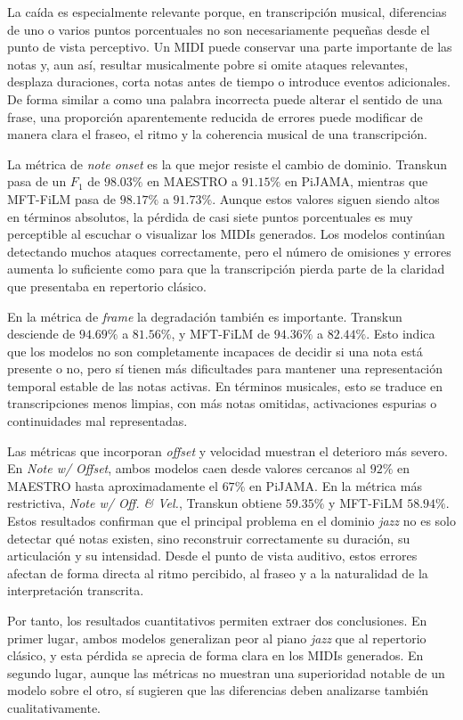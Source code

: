 \documentclass[11pt,spanish,listoffigures,listoftables]{tfgetsinf}
\begin{document}
La caída es especialmente relevante porque, en transcripción musical, diferencias de
uno o varios puntos porcentuales no son necesariamente pequeñas desde el punto de
vista perceptivo. Un MIDI puede conservar una parte importante de las notas y, aun así,
resultar musicalmente pobre si omite ataques relevantes, desplaza duraciones, corta
notas antes de tiempo o introduce eventos adicionales. De forma similar a como una
palabra incorrecta puede alterar el sentido de una frase, una proporción aparentemente
reducida de errores puede modificar de manera clara el fraseo, el ritmo y la coherencia
musical de una transcripción.

La métrica de \textit{note onset} es la que mejor resiste el cambio de dominio. Transkun pasa
de un $F_1$ de $98.03\%$ en MAESTRO a $91.15\%$ en PiJAMA, mientras que MFT-FiLM
pasa de $98.17\%$ a $91.73\%$. Aunque estos valores siguen siendo altos en términos
absolutos, la pérdida de casi siete puntos porcentuales es muy perceptible al escuchar
o visualizar los MIDIs generados. Los modelos continúan detectando muchos ataques
correctamente, pero el número de omisiones y errores aumenta lo suficiente como para
que la transcripción pierda parte de la claridad que presentaba en repertorio clásico.

En la métrica de \textit{frame} la degradación también es importante. Transkun desciende
de $94.69\%$ a $81.56\%$, y MFT-FiLM de $94.36\%$ a $82.44\%$. Esto indica que los
modelos no son completamente incapaces de decidir si una nota está presente o no, pero
sí tienen más dificultades para mantener una representación temporal estable de las
notas activas. En términos musicales, esto se traduce en transcripciones menos limpias,
con más notas omitidas, activaciones espurias o continuidades mal representadas.

Las métricas que incorporan \textit{offset} y velocidad muestran el deterioro más severo.
En \textit{Note w/ Offset}, ambos modelos caen desde valores cercanos al $92\%$ en MAESTRO
hasta aproximadamente el $67\%$ en PiJAMA. En la métrica más restrictiva,
\textit{Note w/ Off. \& Vel.}, Transkun obtiene $59.35\%$ y MFT-FiLM $58.94\%$. Estos
resultados confirman que el principal problema en el dominio \textit{jazz} no es solo detectar
qué notas existen, sino reconstruir correctamente su duración, su articulación y su
intensidad. Desde el punto de vista auditivo, estos errores afectan de forma directa al
ritmo percibido, al fraseo y a la naturalidad de la interpretación transcrita.


Por tanto, los resultados cuantitativos permiten extraer dos conclusiones. En primer
lugar, ambos modelos generalizan peor al piano \textit{jazz} que al repertorio clásico, y esta
pérdida se aprecia de forma clara en los MIDIs generados. En segundo lugar, aunque
las métricas no muestran una superioridad notable de un modelo sobre el otro,
sí sugieren que las diferencias deben analizarse también cualitativamente.
\end{document}
